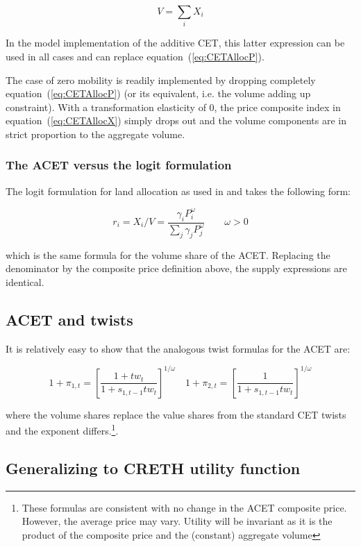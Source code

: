 \[
V=\sum\limits_{i} {X_i}
\]

\noindent In the model implementation of the additive CET, this latter expression can
be used in all cases and can replace equation~(\ref{eq:CETAllocP}).

The case of zero mobility is readily implemented by dropping completely equation~(\ref{eq:CETAllocP})
(or its equivalent, i.e. the volume adding up constraint). With a transformation elasticity of 0,
the price composite index in equation~(\ref{eq:CETAllocX}) simply drops out and the volume components are in
strict proportion to the aggregate volume.

\subsubsection{The ACET versus the logit formulation}

The logit formulation for land allocation as used in \cite{FujimorietalFoodSec2014}
and \cite{GCAM2011a} takes the following form:

\[
r_i = X_i/V = \frac{\gamma_i P_i^\omega} {\sum_j{\gamma_j P_j^\omega}} \qquad \omega > 0
\]

\noindent which is the same formula for the volume share of the ACET. Replacing
the denominator by the composite price definition above, the supply
expressions are identical.

\subsection{ACET and twists}

It is relatively easy to show that the analogous twist formulas
for the ACET are:

\begin{displaymath}
1+\pi_{1,t} = \left[
\frac{1+\mathit{tw_t}}{1+s_{1,t-1}\mathit{tw_t}}
\right]^{1/\omega} \quad
1+\pi_{2,t} = \left[
\frac{1}{1+s_{1,t-1}\mathit{tw_t}}
\right]^{1/\omega}
\end{displaymath}

\noindent where the volume shares replace the value shares
from the standard CET twists and the exponent differs.\footnote{These
formulas are consistent with no change in the ACET composite price.
However, the average price may vary. Utility will be invariant as
it is the product of the composite price and the (constant) aggregate volume}.

\ifCESDetail

\subsection{Generalizing to CRETH utility function}

